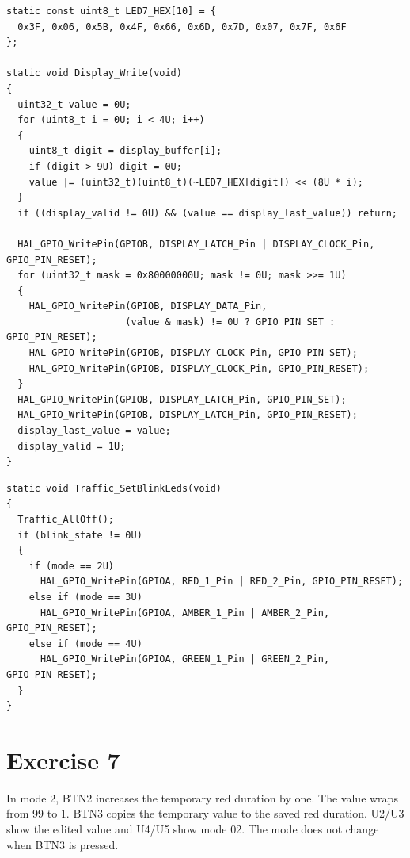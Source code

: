 \documentclass[12pt,a4paper]{article}
\begin{document}
\noindent\begin{minipage}{\linewidth}
\begin{lstlisting}[caption={Static seven-segment output -- Exercise 6}]
static const uint8_t LED7_HEX[10] = {
  0x3F, 0x06, 0x5B, 0x4F, 0x66, 0x6D, 0x7D, 0x07, 0x7F, 0x6F
};

static void Display_Write(void)
{
  uint32_t value = 0U;
  for (uint8_t i = 0U; i < 4U; i++)
  {
    uint8_t digit = display_buffer[i];
    if (digit > 9U) digit = 0U;
    value |= (uint32_t)(uint8_t)(~LED7_HEX[digit]) << (8U * i);
  }
  if ((display_valid != 0U) && (value == display_last_value)) return;

  HAL_GPIO_WritePin(GPIOB, DISPLAY_LATCH_Pin | DISPLAY_CLOCK_Pin, GPIO_PIN_RESET);
  for (uint32_t mask = 0x80000000U; mask != 0U; mask >>= 1U)
  {
    HAL_GPIO_WritePin(GPIOB, DISPLAY_DATA_Pin,
                     (value & mask) != 0U ? GPIO_PIN_SET : GPIO_PIN_RESET);
    HAL_GPIO_WritePin(GPIOB, DISPLAY_CLOCK_Pin, GPIO_PIN_SET);
    HAL_GPIO_WritePin(GPIOB, DISPLAY_CLOCK_Pin, GPIO_PIN_RESET);
  }
  HAL_GPIO_WritePin(GPIOB, DISPLAY_LATCH_Pin, GPIO_PIN_SET);
  HAL_GPIO_WritePin(GPIOB, DISPLAY_LATCH_Pin, GPIO_PIN_RESET);
  display_last_value = value;
  display_valid = 1U;
}
\end{lstlisting}
\end{minipage}

\noindent\begin{minipage}{\linewidth}
\begin{lstlisting}[caption={Mode-dependent LED blinking -- Exercise 6}]
static void Traffic_SetBlinkLeds(void)
{
  Traffic_AllOff();
  if (blink_state != 0U)
  {
    if (mode == 2U)
      HAL_GPIO_WritePin(GPIOA, RED_1_Pin | RED_2_Pin, GPIO_PIN_RESET);
    else if (mode == 3U)
      HAL_GPIO_WritePin(GPIOA, AMBER_1_Pin | AMBER_2_Pin, GPIO_PIN_RESET);
    else if (mode == 4U)
      HAL_GPIO_WritePin(GPIOA, GREEN_1_Pin | GREEN_2_Pin, GPIO_PIN_RESET);
  }
}
\end{lstlisting}
\end{minipage}

\section{Exercise 7}

In mode 2, BTN2 increases the temporary red duration by one. The value
wraps from 99 to 1. BTN3 copies the temporary value to the saved red
duration. U2/U3 show the edited value and U4/U5 show mode 02.
The mode does not change when BTN3 is pressed.
\end{document}
